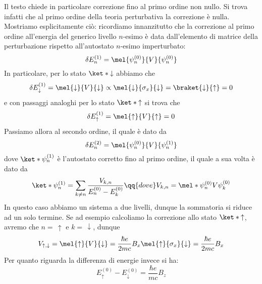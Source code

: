 \begin{soluzione}
   Il testo chiede in particolare correzione fino al primo ordine non nullo. Si trova infatti che al primo ordine della teoria perturbativa la correzione è nulla. Mostriamo esplicitamente ciò: ricordiamo innanzitutto che la correzione al primo ordine all'energia del generico livello $n$-esimo è data dall'elemento di matrice della perturbazione rispetto all'autostato $n$-esimo imperturbato:
   \begin{equation*}
      \delta E_n^{(1)}
      =\mel{\psi_n^{(0)}}{V}{\psi_n^{(0)}}
   \end{equation*}
   In particolare, per lo stato $\ket*{\downarrow}$ abbiamo che
   \begin{equation*}
      \delta E_{\downarrow}^{(1)}
      =\mel{\downarrow}{V}{\downarrow}
      \propto \mel{\downarrow}{\sigma_x}{\downarrow}
      =\braket{\downarrow}{\uparrow}
      =0
   \end{equation*}
   e con passaggi analoghi per lo stato $\ket*{\uparrow}$ si trova che
   \begin{equation*}
      \delta E_{\uparrow}^{(1)}
      =\mel{\uparrow}{V}{\uparrow}
      =0
   \end{equation*}
   Passiamo allora al secondo ordine, il quale è dato da
   \begin{equation*}
      \delta E_n^{(2)}
      =\mel{\psi_n^{(0)}}{V}{\psi_n^{(1)}}
   \end{equation*}
   dove $\ket*{\psi_n^{(1)}}$ è l'autostato corretto fino al primo ordine, il quale a sua volta è dato da
   \begin{equation*}
      \ket*{\psi_n^{(1)}}
      =\sum_{k \neq n} \frac{V_{k,n}}{E_n^{(0)} - E_k^{(0)}}
      \qq{dove}
      V_{k,n}=\mel*{\psi_n^{(0)}}{V}{\psi_k^{(0)}}
   \end{equation*}
   In questo caso abbiamo un sistema a due livelli, dunque la sommatoria si riduce ad un solo termine. Se ad esempio calcoliamo la correzione allo stato $\ket*{\uparrow}$, avremo che $n=\,\uparrow$ e $k=\,\downarrow$, dunque
   \begin{equation*}
      V_{\uparrow,\downarrow}
      =\mel{\uparrow}{V}{\downarrow}
      =\frac{\hbar e}{2 m c} B_x \mel{\uparrow}{\sigma_x}{\downarrow}
      =\frac{\hbar e}{2 m c} B_x
   \end{equation*}
   Per quanto riguarda la differenza di energie invece si ha:
   \begin{equation*}
      E_{\uparrow}^{(0)} - E_{\downarrow}^{(0)}
      =\frac{\hbar e}{m c} B_z
   \end{equation*}

\end{soluzione}
